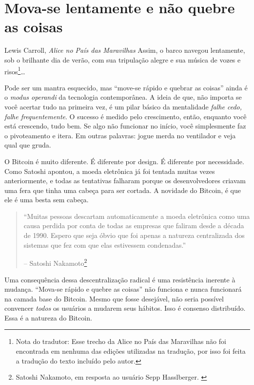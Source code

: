 \chapter{Mova-se lentamente e não quebre as coisas}
\label{les:18}

\begin{chapquote}{Lewis Carroll, \textit{Alice no País das Maravilhas}}
Assim, o barco navegou lentamente, sob o brilhante dia de verão, com sua tripulação alegre e sua música de vozes e risos\footnote{Nota do tradutor: Esse trecho da Alice no País das Maravilhas não foi encontrada em nenhuma das edições utilizadas na tradução, por isso foi feita a tradução do texto incluído pelo autor.}\ldots
\end{chapquote}

Pode ser um mantra esquecido, mas \enquote{move-se rápido e quebrar as coisas} ainda é o \textit{modus operandi} da tecnologia contemporânea. A ideia de que, não importa se você acertar tudo na primeira vez, é um pilar básico da mentalidade \textit{falhe cedo, falhe frequentemente}. O sucesso é medido pelo crescimento, então, enquanto você está crescendo, tudo bem. Se algo não funcionar no início, você simplesmente faz o pivoteamento e itera. Em outras palavras: jogue merda no ventilador e veja qual que gruda.

O Bitcoin é muito diferente. É diferente por design. É diferente por necessidade. Como Satoshi apontou, a moeda eletrônica já foi tentada muitas vezes anteriormente, e todas as tentativas falharam porque os desenvolvedores criavam uma fera que tinha uma cabeça para ser cortada. A novidade do Bitcoin, é que ele é uma besta sem cabeça.

\begin{quotation}\begin{samepage}
\enquote{Muitas pessoas descartam automaticamente a moeda eletrônica como uma causa perdida
por conta de todas as empresas que faliram desde a década de 1990. Espero que seja
óbvio que foi apenas a natureza centralizada dos sistemas que fez com que elas estivessem condenadas.}
\begin{flushright} -- Satoshi Nakamoto\footnote{Satoshi Nakamoto, em resposta ao usuário Sepp Hasslberger. \cite{satoshi-centralized-nature}}
\end{flushright}\end{samepage}\end{quotation}

Uma consequência dessa descentralização radical é uma resistência inerente à mudança. \enquote{Mova-se rápido e quebre as coisas} não funciona e nunca funcionará na camada base do Bitcoin. Mesmo que fosse desejável, não seria possível convencer \textit{todos} os usuários a mudarem seus hábitos. Isso é consenso distribuído. Essa é a natureza do Bitcoin.


